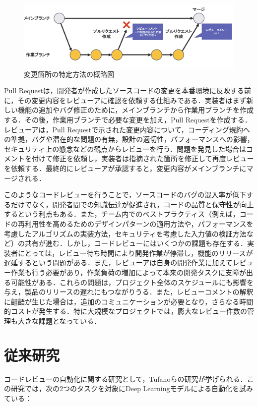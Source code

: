 \documentclass[11pt]{jreport}
\begin{document}
\begin{figure}[ht]
    \centerline{\includegraphics[width=1.0\linewidth]{@BSthesis2024_Akamatsu/Akamatsu_figs/pull-request.png}}
    \caption{変更箇所の特定方法の概略図}
    \label{fig:Insufficient_documentation}
\end{figure}

Pull Requestは，開発者が作成したソースコードの変更を本番環境に反映する前に，その変更内容をレビューアに確認を依頼する仕組みである．実装者はまず新しい機能の追加やバグ修正のために，メインブランチから作業用ブランチを作成する．その後，作業用ブランチで必要な変更を加え，Pull Requestを作成する．レビューアは，Pull Requestで示された変更内容について，コーディング規約への準拠，バグや潜在的な問題の有無，設計の適切性，パフォーマンスへの影響，セキュリティ上の懸念などの観点からレビューを行う．問題を発見した場合はコメントを付けて修正を依頼し，実装者は指摘された箇所を修正して再度レビューを依頼する．最終的にレビューアが承認すると，変更内容がメインブランチにマージされる．

このようなコードレビューを行うことで，ソースコードのバグの混入率が低下する\cite{Vable2021Code}だけでなく，開発者間での知識伝達が促進され\cite{bacchelli2013expectations}，コードの品質と保守性が向上するという利点もある．また，チーム内でのベストプラクティス（例えば，コードの再利用性を高めるためのデザインパターンの適用方法や，パフォーマンスを考慮したアルゴリズムの実装方法，セキュリティを考慮した入力値の検証方法など）の共有が進む．しかし，コードレビューにはいくつかの課題も存在する．実装者にとっては，レビュー待ち時間により開発作業が停滞し，機能のリリースが遅延するという問題がある．また，レビューアは自身の開発作業に加えてレビュー作業も行う必要があり，作業負荷の増加によって本来の開発タスクに支障が出る可能性がある．これらの問題は，プロジェクト全体のスケジュールにも影響を与え，製品のリリースの遅れにもつながりうる．また，レビューコメントの解釈に齟齬が生じた場合は，追加のコミュニケーションが必要となり，さらなる時間的コストが発生する．特に大規模なプロジェクトでは，膨大なレビュー件数の管理も大きな課題となっている．

\section{従来研究}
コードレビューの自動化に関する研究として，Tufanoらの研究\cite{tufano2022using}が挙げられる．この研究では，次の2つのタスクを対象にDeep Learningモデルによる自動化を試みている：
\end{document}
